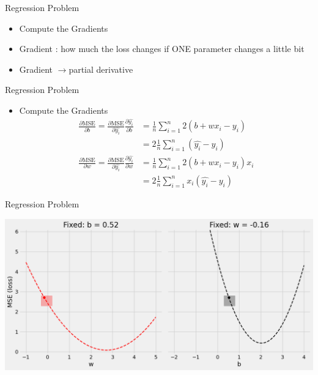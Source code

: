 \documentclass[pdflatex,compress,mathserif]{beamer}
\begin{document}
\begin{frame}{Regression Problem}
	\begin{itemize}
		\item Compute the Gradients
		\item Gradient : how much the loss changes if ONE parameter changes a little bit
		\item Gradient $\rightarrow$partial derivative
	\end{itemize}
\end{frame}

\begin{frame}{Regression Problem}
	\begin{itemize}
		\item Compute the Gradients
		$$
		\begin{aligned}
			\frac{\partial{\text{MSE}}}{\partial{b}} = \frac{\partial{\text{MSE}}}{\partial{\hat{y_i}}} \frac{\partial{\hat{y_i}}}{\partial{b}} &= \frac{1}{n} \sum_{i=1}^n{2(b + w x_i - y_i)} 
			\\
			&= 2 \frac{1}{n} \sum_{i=1}^n{(\hat{y_i} - y_i)}
			\\
			\frac{\partial{\text{MSE}}}{\partial{w}} = \frac{\partial{\text{MSE}}}{\partial{\hat{y_i}}} \frac{\partial{\hat{y_i}}}{\partial{w}} &= \frac{1}{n} \sum_{i=1}^n{2(b + w x_i - y_i) x_i} 
			\\
			&= 2 \frac{1}{n} \sum_{i=1}^n{x_i (\hat{y_i} - y_i)}
		\end{aligned}
		$$
	\end{itemize}
\end{frame}

\begin{frame}{Regression Problem}
	\begin{center}
		\includegraphics[width=\linewidth]{img/08}
	\end{center}
\end{frame}
\end{document}
